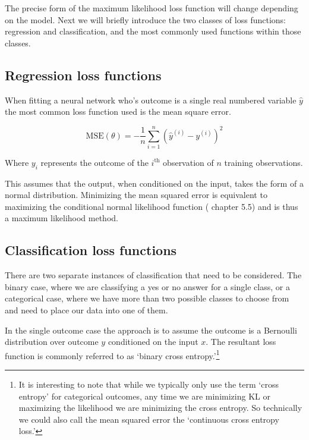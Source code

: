 \documentclass[]{book}
\let\rmarkdownfootnote\footnote%
\def\footnote{\protect\rmarkdownfootnote}
\theoremstyle{definition}
\theoremstyle{definition}
\theoremstyle{definition}
\theoremstyle{remark}
\let\BeginKnitrBlock\begin \let\EndKnitrBlock\end
\begin{document}
The precise form of the maximum likelihood loss function will change
depending on the model. Next we will briefly introduce the two classes
of loss functions: regression and classification, and the most commonly
used functions within those classes.

\subsection{Regression loss functions}\label{regression-loss-functions}

When fitting a neural network who's outcome is a single real numbered
variable \(\hat{y}\) the most common loss function used is the mean
square error.

\BeginKnitrBlock{definition}[Expected mean squared error loss]
\protect\hypertarget{def:mse}{}{\label{def:mse} {}
}\[\text{MSE}(\theta) = -\frac{1}{n} \sum_{i = 1}^{n} (\hat{y}^{(i)} - y^{(i)})^2\]

Where \(y_i\) represents the outcome of the \(i^{\text{th}}\)
observation of \(n\) training observations.
\EndKnitrBlock{definition}

This assumes that the output, when conditioned on the input, takes the
form of a normal distribution. Minimizing the mean squared error is
equivalent to maximizing the conditional normal likelihood function
(\citet{goodfellow_DL} chapter 5.5) and is thus a maximum likelihood
method.

\subsection{Classification loss
functions}\label{classification-loss-functions}

There are two separate instances of classification that need to be
considered. The binary case, where we are classifying a yes or no answer
for a single class, or a categorical case, where we have more than two
possible classes to choose from and need to place our data into one of
them.

In the single outcome case the approach is to assume the outcome is a
Bernoulli distribution over outcome \(y\) conditioned on the input
\(x\). The resultant loss function is commonly referred to as `binary
cross entropy.'\footnote{It is interesting to note that while we
  typically only use the term `cross entropy' for categorical outcomes,
  any time we are minimizing KL or maximizing the likelihood we are
  minimizing the cross entropy. So technically we could also call the
  mean squared error the `continuous cross entropy loss.'}
\end{document}
